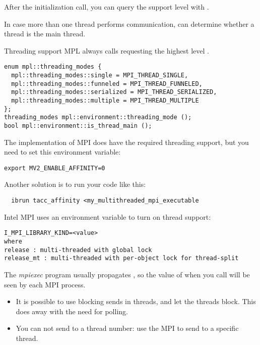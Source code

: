 After the initialization call, you can query the support level
with .

In case more than one thread performs communication, 
can determine whether a thread is the main thread.

\begin{mplnote}{Threading support}
  \ac{MPL} always calls 
  requesting the highest level .
\begin{lstlisting}
enum mpl::threading_modes {
  mpl::threading_modes::single = MPI_THREAD_SINGLE, 
  mpl::threading_modes::funneled = MPI_THREAD_FUNNELED,
  mpl::threading_modes::serialized = MPI_THREAD_SERIALIZED,
  mpl::threading_modes::multiple = MPI_THREAD_MULTIPLE
};
threading_modes mpl::environment::threading_mode ();
bool mpl::environment::is_thread_main ();
\end{lstlisting}
\end{mplnote}

\begin{tacc}
  The  implementation of MPI
  does have the required threading support, but you need to set this environment variable:  
\begin{verbatim}
export MV2_ENABLE_AFFINITY=0
\end{verbatim}
  Another solution is to run your code like this:
\begin{verbatim}
  ibrun tacc_affinity <my_multithreaded_mpi_executable
\end{verbatim}
  Intel MPI uses an environment variable to turn on thread support:
\begin{verbatim}
I_MPI_LIBRARY_KIND=<value>
where
release : multi-threaded with global lock
release_mt : multi-threaded with per-object lock for thread-split  
\end{verbatim}
\end{tacc}

The \emph{mpiexec}
program usually propagates ,
so the value of  when you call 
will be seen by each MPI process.

\begin{itemize}
\item It is possible to use blocking sends in threads, and let the
  threads block. This does away with the need for polling.
\item You can not send to a thread number: use the MPI
   to send to a specific thread.
\end{itemize}


